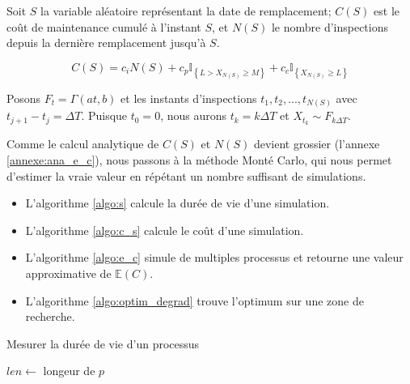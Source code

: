 \documentclass[10pt,a4paper]{article}
\begin{document}
Soit $S$ la variable aléatoire représentant la date de remplacement; $C(S)$ est le coût de maintenance cumulé à l’instant $S$, et $N(S)$ le nombre d'inspections depuis la dernière remplacement jusqu'à $S$.

\begin{equation}
    \label{c_s_de}
    C\left( S \right) = {c_i}N\left( S \right) + {c_p}{\mathbb{I}_{\left\{ {L > {X_{N\left( S \right)}} \geq M} \right\}}} + {c_c}{\mathbb{I}_{\left\{ {{X_{N\left( S \right)}} \geq L} \right\}}}
\end{equation}

Posons ${F_t} = \Gamma \left( {at,b} \right)$ et les instants d'inspections ${t_1},{t_2},...,{t_{N\left( S \right)}}$ avec ${t_{j + 1}} - {t_j} = \Delta T$. Puisque $t_0 = 0$, nous aurons ${t_k} = k\Delta T$ et $X_{t_k} \sim F_{k\Delta T}$.

Comme le calcul analytique de $C(S)$ et $N(S)$ devient grossier (l'annexe \eqref{annexe:ana_e_c}), nous passons à la méthode Monté Carlo, qui nous permet d'estimer la vraie valeur en répétant un nombre suffisant de simulations.
\begin{itemize}
    \item L'algorithme \eqref{algo:s} calcule la durée de vie d'une simulation.
    \item L'algorithme \eqref{algo:c_s} calcule le coût d'une simulation.
    \item L'algorithme \eqref{algo:e_c} simule de multiples processus et retourne une valeur approximative de $\mathbb{E}(C)$.
    \item L'algorithme \eqref{algo:optim_degrad} trouve l'optimum sur une zone de recherche.
\end{itemize}

\begin{algorithm}[!h]
    \caption{Mesurer la durée de vie d'un processus}
    \label{algo:s}
    $len \leftarrow $ longeur de $p$\;
\end{algorithm}
\end{document}

